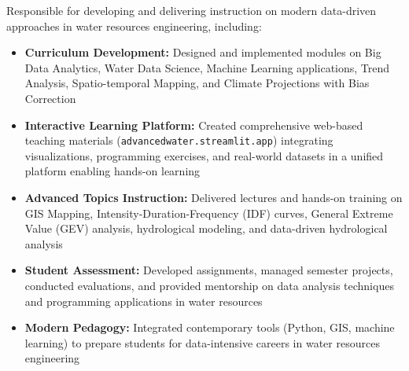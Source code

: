 \documentclass[11pt,a4paper,sans]{moderncv}
\begin{document}
{Responsible for developing and delivering instruction on modern data-driven approaches in water resources engineering, including:
\begin{itemize}
\item \textbf{Curriculum Development:} Designed and implemented modules on Big Data Analytics, Water Data Science, Machine Learning applications, Trend Analysis, Spatio-temporal Mapping, and Climate Projections with Bias Correction
\item \textbf{Interactive Learning Platform:} Created comprehensive web-based teaching materials (\texttt{advancedwater.streamlit.app}) integrating visualizations, programming exercises, and real-world datasets in a unified platform enabling hands-on learning
\item \textbf{Advanced Topics Instruction:} Delivered lectures and hands-on training on GIS Mapping, Intensity-Duration-Frequency (IDF) curves, General Extreme Value (GEV) analysis, hydrological modeling, and data-driven hydrological analysis
\item \textbf{Student Assessment:} Developed assignments, managed semester projects, conducted evaluations, and provided mentorship on data analysis techniques and programming applications in water resources
\item \textbf{Modern Pedagogy:} Integrated contemporary tools (Python, GIS, machine learning) to prepare students for data-intensive careers in water resources engineering
\end{itemize}}
\end{document}

